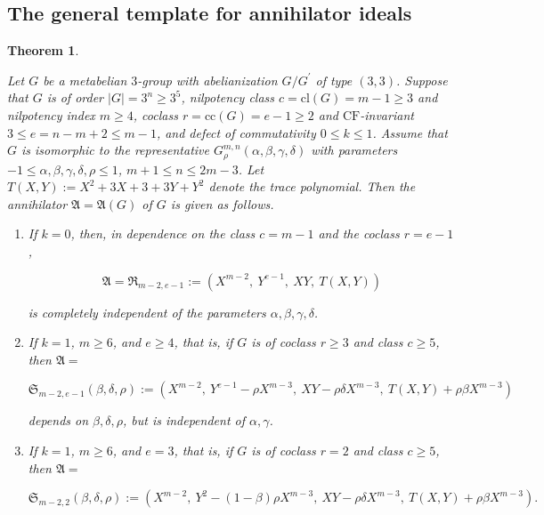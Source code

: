 \documentclass{amsart}
\newtheorem{theorem}{Theorem}[section]
\theoremstyle{definition}
\numberwithin{equation}{section}
\begin{document}
\subsection{The general template for annihilator ideals}
\label{ss:TemplateSmbOrd}

\begin{theorem}
\label{thm:TemplateSmbOrd}

Let \(G\) be a metabelian \(3\)-group with abelianization \(G/G^\prime\) of type \((3,3)\).
Suppose that \(G\) is of order \(\lvert G\rvert=3^n\ge 3^5\),
nilpotency class \(c=\mathrm{cl}(G)=m-1\ge 3\) and nilpotency index \(m\ge 4\),
coclass \(r=\mathrm{cc}(G)=e-1\ge 2\) and \(\mathrm{CF}\)-invariant \(3\le e=n-m+2\le m-1\),
and defect of commutativity \(0\le k\le 1\).
Assume that \(G\) is isomorphic to the representative \(G_\rho^{m,n}(\alpha,\beta,\gamma,\delta)\)
with parameters \(-1\le\alpha,\beta,\gamma,\delta,\rho\le 1\), \(m+1\le n\le 2m-3\).
Let \(T(X,Y):=X^2+3X+3+3Y+Y^2\) denote the trace polynomial.
Then the annihilator \(\mathfrak{A}=\mathfrak{A}(G)\) of \(G\) is given as follows.

\begin{enumerate}

\item
If \(k=0\), then, in dependence on the class \(c=m-1\) and the coclass \(r=e-1\),

\begin{equation}
\label{eqn:SmbOrdWithoutDefect}
\mathfrak{A}=\mathfrak{R}_{m-2,e-1}:=\left(X^{m-2},\ Y^{e-1},\ XY,\ T(X,Y)\right)
\end{equation}

\noindent
is completely independent of the parameters  \(\alpha,\beta,\gamma,\delta\).

\item
If \(k=1\), \(m\ge 6\), and \(e\ge 4\), that is, if \(G\) is of coclass \(r\ge 3\) and class \(c\ge 5\), then \(\mathfrak{A}=\)

\begin{equation}
\label{eqn:TemplateSmbOrd}
\mathfrak{S}_{m-2,e-1}(\beta,\delta,\rho):=\left(X^{m-2},\ Y^{e-1}-\rho X^{m-3},\ XY-\rho\delta X^{m-3},\ T(X,Y)+\rho\beta X^{m-3}\right)
\end{equation}

\noindent
depends on \(\beta,\delta,\rho\), but is independent of \(\alpha,\gamma\).

\item
If \(k=1\), \(m\ge 6\), and \(e=3\), that is, if \(G\) is of coclass \(r=2\) and class \(c\ge 5\), then \(\mathfrak{A}=\)

\begin{equation}
\label{eqn:SmbOrdSec}
\mathfrak{S}_{m-2,2}(\beta,\delta,\rho):=\left(X^{m-2},\ Y^2-(1-\beta)\rho X^{m-3},\ XY-\rho\delta X^{m-3},\ T(X,Y)+\rho\beta X^{m-3}\right).
\end{equation}


\end{enumerate}

\end{theorem}
\end{document}
